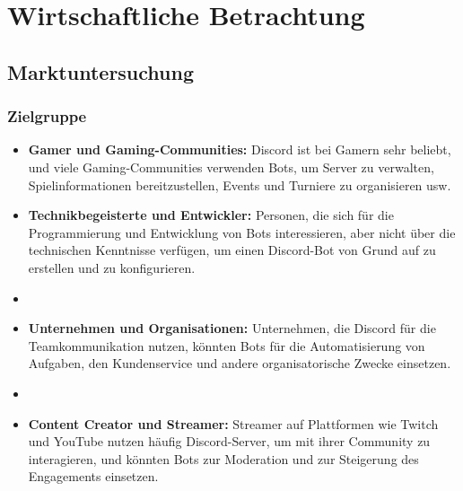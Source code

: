 
\section{Wirtschaftliche Betrachtung}\label{wirtschaftliche-betrachtung}

\subsection{Marktuntersuchung}\label{marktuntersuchung}

\subsubsection{Zielgruppe}\label{zielgruppe}


\begin{itemize}
  \item \textbf{Gamer und Gaming-Communities:}
  Discord ist bei Gamern sehr beliebt, und viele Gaming-Communities verwenden Bots, um Server zu verwalten, Spielinformationen bereitzustellen, Events und Turniere zu organisieren usw.

  \item \textbf{Technikbegeisterte und Entwickler:}
  Personen, die sich für die Programmierung und Entwicklung von Bots interessieren, aber nicht über die technischen Kenntnisse verfügen, um einen Discord-Bot von Grund auf zu erstellen und zu konfigurieren.

  \item \item \textbf{Unternehmen und Organisationen:}
  Unternehmen, die Discord für die Teamkommunikation nutzen, könnten Bots für die Automatisierung von Aufgaben, den Kundenservice und andere organisatorische Zwecke einsetzen.

  \item \item \textbf{Content Creator und Streamer:}
  Streamer auf Plattformen wie Twitch und YouTube nutzen häufig Discord-Server, um mit ihrer Community zu interagieren, und könnten Bots zur Moderation und zur Steigerung des Engagements einsetzen.
\end{itemize}


